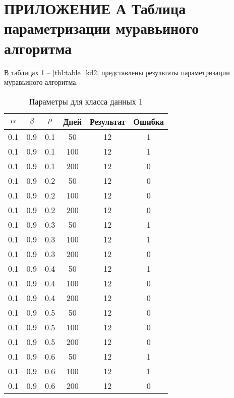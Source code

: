 \chapter*{ПРИЛОЖЕНИЕ А Таблица параметризации муравьиного алгоритма}
В таблицах \ref{tbl:table_kd1} -- \ref{tbl:table_kd2} представлены результаты параметризации муравьиного алгоритма.
\renewcommand{\thetable}{A.1}

\begin{table}[h]
	\begin{center}
        \begin{threeparttable}
        \captionsetup{justification=raggedright,singlelinecheck=off}
		\caption{Параметры для класса данных 1\label{tbl:table_kd1}}
		\begin{tabular}{|c|c|c|c|c|c|}
	\hline
	$\alpha$ & $\beta$ & $\rho$ & Дней & Результат & Ошибка 
	\\ \hline
	0.1 &  0.9 &  0.1 &   50 &    12 &     1 \\
	0.1 &  0.9 &  0.1 &  100 &    12 &     1 \\
	0.1 &  0.9 &  0.1 &  200 &    12 &     0 \\
   \hline
	0.1 &  0.9 &  0.2 &   50 &    12 &     0 \\
	0.1 &  0.9 &  0.2 &  100 &    12 &     0 \\
	0.1 &  0.9 &  0.2 &  200 &    12 &     0 \\
   \hline
	0.1 &  0.9 &  0.3 &   50 &    12 &     1 \\
	0.1 &  0.9 &  0.3 &  100 &    12 &     1 \\
	0.1 &  0.9 &  0.3 &  200 &    12 &     0 \\
   \hline
	0.1 &  0.9 &  0.4 &   50 &    12 &     1 \\
	0.1 &  0.9 &  0.4 &  100 &    12 &     0 \\
	0.1 &  0.9 &  0.4 &  200 &    12 &     0 \\
   \hline
	0.1 &  0.9 &  0.5 &   50 &    12 &     0 \\
	0.1 &  0.9 &  0.5 &  100 &    12 &     0 \\
	0.1 &  0.9 &  0.5 &  200 &    12 &     0 \\
   \hline
	0.1 &  0.9 &  0.6 &   50 &    12 &     1 \\
	0.1 &  0.9 &  0.6 &  100 &    12 &     1 \\
	0.1 &  0.9 &  0.6 &  200 &    12 &     0 \\

\end{tabular}
\end{threeparttable}
\end{center}
\end{table}
